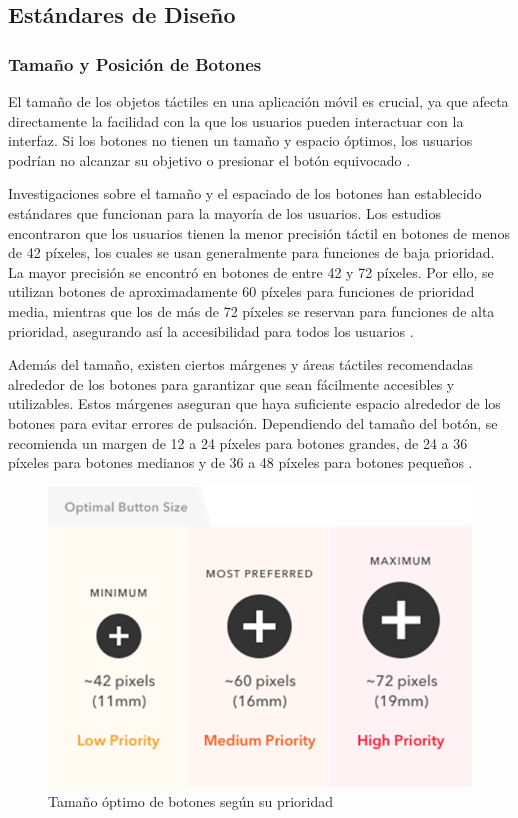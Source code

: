\subsection{Estándares de Diseño}
\subsubsection{Tamaño y Posición de Botones}
El tamaño de los objetos táctiles en una aplicación móvil es crucial, ya que afecta directamente la facilidad con la que los usuarios pueden interactuar con la interfaz. Si los botones no tienen un tamaño y espacio óptimos, los usuarios podrían no alcanzar su objetivo o presionar el botón equivocado \cite{Bustos2022}.

Investigaciones sobre el tamaño y el espaciado de los botones han establecido estándares que funcionan para la mayoría de los usuarios. Los estudios encontraron que los usuarios tienen la menor precisión táctil en botones de menos de 42 píxeles, los cuales se usan generalmente para funciones de baja prioridad. La mayor precisión se encontró en botones de entre 42 y 72 píxeles. Por ello, se utilizan botones de aproximadamente 60 píxeles para funciones de prioridad media, mientras que los de más de 72 píxeles se reservan para funciones de alta prioridad, asegurando así la accesibilidad para todos los usuarios \cite{Anthony2019}.

Además del tamaño, existen ciertos márgenes y áreas táctiles recomendadas alrededor de los botones para garantizar que sean fácilmente accesibles y utilizables. Estos márgenes aseguran que haya suficiente espacio alrededor de los botones para evitar errores de pulsación. Dependiendo del tamaño del botón, se recomienda un margen de 12 a 24 píxeles para botones grandes, de 24 a 36 píxeles para botones medianos y de 36 a 48 píxeles para botones pequeños \cite{Anthony2019}. 

\begin{figure}[!h]
    \centering
    \includegraphics[width=0.5\linewidth]{figuras/optimal_button_size.png}
    \caption{Tamaño óptimo de botones según su prioridad}
    \label{fig:botones_optimos}
\end{figure}


